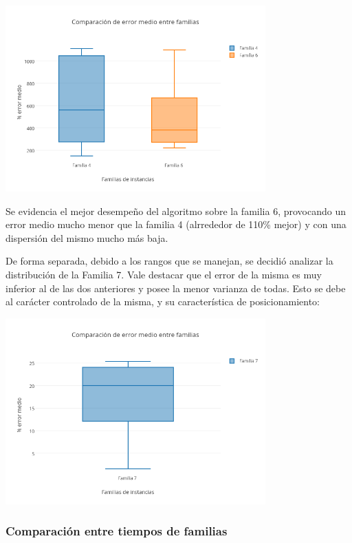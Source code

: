 \vspace*{0.3cm} \vspace*{0.3cm}
  \begin{center}
 \includegraphics[width=0.75\textwidth]{./EJ2/box.png}
\end{center}

Se evidencia el mejor desempeño del algoritmo sobre la familia 6, provocando un error medio mucho menor que la familia 4 (alrrededor de 110\% mejor) y con una dispersión del mismo mucho más baja. 

De forma separada, debido a los rangos que se manejan, se decidió analizar la distribución de la Familia 7. Vale destacar que el error de la misma es muy inferior al de las dos anteriores y posee la menor varianza de todas. Esto se debe al carácter controlado de la misma, y su característica de posicionamiento: 
\vspace*{0.3cm} \vspace*{0.3cm}
  \begin{center}
 \includegraphics[width=0.75\textwidth]{./EJ2/box1.png}
\end{center}

\subsubsection*{Comparación entre tiempos de familias}


